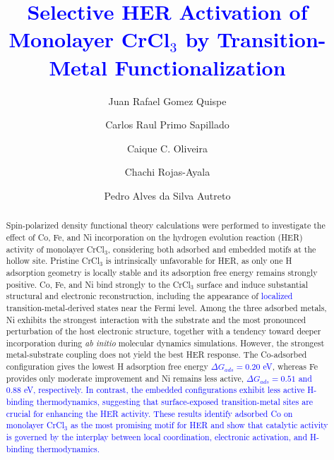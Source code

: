 \documentclass[a4paper,fleqn]{cas-dc}
\begin{document}
\let\WriteBookmarks\relax
\def\floatpagepagefraction{1}
\def\textpagefraction{.001}


\title[mode=title]{\textcolor{blue}{Selective HER Activation of Monolayer \texorpdfstring{CrCl$_3$}{CrCl3} by Transition-Metal Functionalization}}


\author[1]{Juan Rafael Gomez Quispe}
\author[2]{Carlos Raul Primo Sapillado}
\author[1]{Caique C. Oliveira}
\author[2]{Chachi Rojas-Ayala}
\author[1]{Pedro Alves da Silva Autreto}\cormark[1]




\begin{abstract}
    Spin-polarized density functional theory calculations were performed to investigate the effect of Co, Fe, and Ni incorporation on the hydrogen evolution reaction (HER) activity of monolayer CrCl$_3$, considering both adsorbed and embedded motifs at the hollow site. Pristine CrCl$_3$ is intrinsically unfavorable for HER, as only one H adsorption geometry is locally stable and its adsorption free energy remains strongly positive. Co, Fe, and Ni bind strongly to the CrCl$_3$ surface and induce substantial structural and electronic reconstruction, including the appearance of \textcolor{blue}{localized} transition-metal-derived states near the Fermi level. Among the three adsorbed metals, Ni exhibits the strongest interaction with the substrate and the most pronounced perturbation of the host electronic structure, together with a tendency toward deeper incorporation during \textit{ab initio} molecular dynamics simulations. However, the strongest metal-substrate coupling does not yield the best HER response. The Co-adsorbed configuration gives the lowest H adsorption free energy \textcolor{blue}{$\Delta G_{ads}=0.20$ eV}, whereas Fe provides only moderate improvement and Ni remains less active, \textcolor{blue}{$\Delta G_{ads}= 0.51$ and 0.88 eV, respectively.} \textcolor{blue}{In contrast, the embedded configurations exhibit less active H-binding thermodynamics, suggesting that surface-exposed transition-metal sites are crucial for enhancing the HER activity. These results identify adsorbed Co on monolayer CrCl$_3$ as the most promising motif for HER and show that catalytic activity is governed by the interplay between local coordination, electronic activation, and H-binding thermodynamics.}
\end{abstract}
\end{document}
